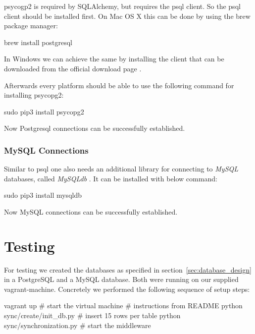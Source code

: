 \documentclass[11pt, a4paper]{article}
\begin{document}
psycogp2 is required by SQLAlchemy, but requires the psql client. So the psql client should be installed first. On Mac OS X this can be done by using the brew package manager:

\begin{bash}
brew install postgresql
\end{bash}

In Windows we can achieve the same by installing the client that can be downloaded from the official download page \cite{psychopg:download}.

Afterwards every platform should be able to use the following command for installing psycopg2:

\begin{bash}
sudo pip3 install psycopg2	
\end{bash}

Now Postgresql connections can be successfully established. 

\subsubsection{MySQL Connections}

Similar to psql one also needs an additional library for connecting to \textit{MySQL} databases, called \textit{MySQLdb} \cite{mysqldb:download}. It can be installed with below command:

\begin{bash}
sudo pip3 install mysqldb
\end{bash}

Now MySQL connections can be successfully established.

\section{Testing}

For testing we created the databases as specified in section~\ref{sec:database_design} in a PostgreSQL and a MySQL database. Both were running on our supplied vagrant-machine. Concretely we performed the following sequence of setup steps:

\vspace{10pt}
\begin{bash}
vagrant up # start the virtual machine
# instructions from README
python sync/create/init\_db.py # insert 15 rows per table
python sync/synchronization.py # start the middleware
\end{bash}
\vspace{10pt}
\end{document}
